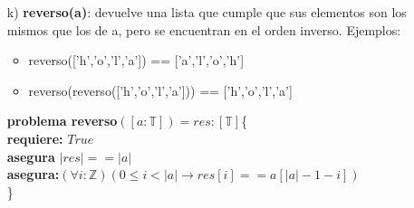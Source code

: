 \documentclass[10pt,a4paper]{article}
\begin{document}
\begin{enumerate}
\item[k)]\textbf{reverso(a)}: devuelve una lista que cumple que sus elementos son los mismos que los de a, pero se encuentran en el orden inverso. Ejemplos:
	\begin{itemize}
	\item reverso([’h’,’o’,’l’,’a’]) == [’a’,’l’,’o’,’h’]
	\item reverso(reverso([’h’,’o’,’l’,’a’])) == [’h’,’o’,’l’,’a’]
	\end{itemize}
	
	\textbf{problema reverso}$([a : \mathbb{T}])=res:[\mathbb{T}]$\{ \\
	\textbf{  requiere:} $True$\\
	\textbf{asegura} $|res|==|a|$\\
	\textbf{asegura:}$(\forall i:\mathbb{Z})(0\leq i<|a|\rightarrow res[i]==a[|a|-1-i])$\\
	\}
\end{enumerate}
\end{document}
